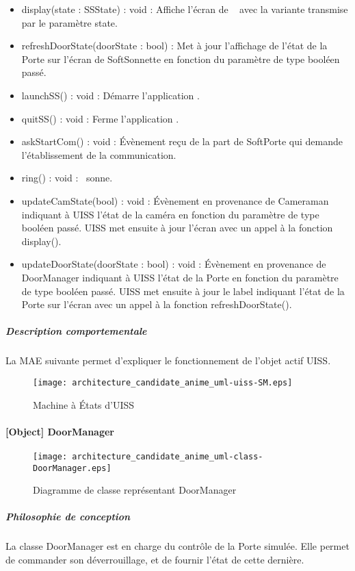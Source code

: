             \begin{itemize}
                \item {display(state : SSState) : void : Affiche l'écran de \appliLin~ avec la variante transmise par le paramètre state.}
                \item {refreshDoorState(doorState : bool) : Met à jour l'affichage de l'état de la Porte sur l'écran de SoftSonnette en fonction du paramètre de type booléen passé.}
                \item {launchSS() : void : Démarre l'application \appliLin.}
                \item {quitSS() : void : Ferme l'application \appliLin.}
                \item {askStartCom() : void : Évènement reçu de la part de SoftPorte qui demande l'établissement de la communication.}
                \item {ring() : void : \actT~sonne.}
                \item {updateCamState(bool) : void : Évènement en provenance de Cameraman indiquant à UISS l'état de la caméra en fonction du paramètre de type booléen passé.
                UISS met ensuite à jour l'écran avec un appel à la fonction display().}
                \item {updateDoorState(doorState : bool) : void : Évènement en provenance de DoorManager indiquant à UISS l'état de la Porte en fonction du paramètre de type booléen passé.
                UISS met ensuite à jour le label indiquant l'état de la Porte sur l'écran avec un appel à la fonction refreshDoorState().}
            \end{itemize}
\newpage
        \subparagraph{Description comportementale}%
        La MAE suivante permet d'expliquer le fonctionnement de l'objet actif UISS.
        \begin{figure} [H]
            \centering
            \texttt{[image: architecture\_candidate\_anime\_uml-uiss-SM.eps]}
            \caption{Machine à États d'UISS}
            \label{MAE-UISS}
        \end{figure}

\newpage

    \paragraph{[Object] DoorManager}%
    \begin{figure} [H]
        \centering
        \texttt{[image: architecture\_candidate\_anime\_uml-class-DoorManager.eps]}
        \caption{Diagramme de classe représentant DoorManager}
        \label{DoorManager}
    \end{figure}
        \subparagraph{Philosophie de conception}%
        La classe DoorManager est en charge du contrôle de la Porte simulée.
        Elle permet de commander son déverrouillage, et de fournir l'état de cette dernière.
    
